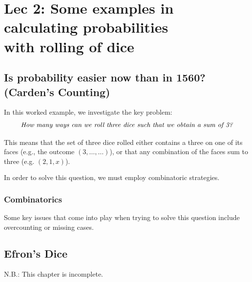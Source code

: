 \chapter[Lec 2: Some examples in calculating probabilities with rolling of dice]{Lec 2: Some examples in \\calculating probabilities \\with rolling of dice}

\section{Is probability easier now than in 1560? (Carden's Counting)}

In this worked example, we investigate the key problem: 
\[\text{\textit{How many ways can we roll three dice such that we obtain a sum of 3?}}\]

This means that the set of three dice rolled either contains 
a three on one of its faces (e.g., the outcome \((3,\ldots ,\ldots )\)), 
or that any combination of the faces sum to three (e.g. \((2,1,x)\)). 

\bigskip 

In order to solve this question, we must employ combinatoric strategies. 

\subsection{Combinatorics}

Some key issues that come into play when trying to solve this question include 
overcounting or missing cases. 

\section{Efron's Dice}

N.B.: This chapter is incomplete.